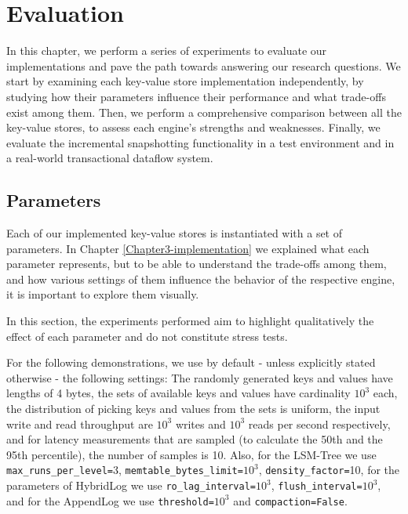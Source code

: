 
\chapter{Evaluation}

\label{Chapter4-evaluation}

In this chapter, we perform a series of experiments to evaluate our implementations and pave the path towards answering our research questions. We start by examining each key-value store implementation independently, by studying how their parameters influence their performance and what trade-offs exist among them. Then, we perform a comprehensive comparison between all the key-value stores, to assess each engine's strengths and weaknesses. Finally, we evaluate the incremental snapshotting functionality in a test environment and in a real-world transactional dataflow system.

\section{Parameters}

Each of our implemented key-value stores is instantiated with a set of parameters. In Chapter \ref{Chapter3-implementation} we explained what each parameter represents, but to be able to understand the trade-offs among them, and how various settings of them influence the behavior of the respective engine, it is important to explore them visually.

In this section, the experiments performed aim to highlight qualitatively the effect of each parameter and do not constitute stress tests.

For the following demonstrations, we use by default - unless explicitly stated otherwise - the following settings: The randomly generated keys and values have lengths of 4 bytes, the sets of available keys and values have cardinality $10^3$ each, the distribution of picking keys and values from the sets is uniform, the input write and read throughput are $10^3$ writes and $10^3$ reads per second respectively, and for latency measurements that are sampled (to calculate the 50th and the 95th percentile), the number of samples is 10. Also, for the LSM-Tree we use \verb"max_runs_per_level="3, \verb"memtable_bytes_limit="$10^3$, \verb"density_factor="10, for the parameters of HybridLog we use \verb"ro_lag_interval="$10^3$, \verb"flush_interval="$10^3$, and for the AppendLog we use \verb|threshold=|$10^3$ and \verb"compaction=False".

